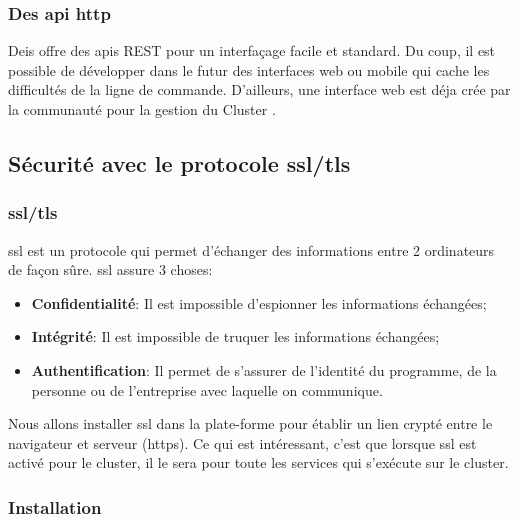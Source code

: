 \begin{onehalfspace}
\subsubsection*{Des \acrshort{api} \acrshort{http}}

Deis offre des \acrshort{api}s REST pour un interfaçage facile et standard. Du coup, il est possible de développer dans le futur des interfaces web ou mobile qui cache les difficultés de la ligne de commande. D'ailleurs, une interface web est déja crée par la communauté pour la gestion du Cluster \cite{deis-ui}.





\subsection{Sécurité avec le protocole \acrshort{ssl}/\acrshort{tls}}

\subsubsection{\acrshort{ssl}/\acrshort{tls}}


\acrshort{ssl} est un protocole qui permet d'échanger des informations entre 2 ordinateurs de façon sûre. \acrshort{ssl} assure 3 choses:

\begin{itemize}
	\item \textbf{Confidentialité}: Il est impossible d'espionner les informations échangées;
	\item \textbf{Intégrité}: Il est impossible de truquer les informations échangées;
	\item \textbf{Authentification}: Il permet de s'assurer de l'identité du programme, de la personne ou de l'entreprise avec laquelle on communique.
\end{itemize}



Nous allons installer \acrshort{ssl} dans la plate-forme pour établir un lien crypté entre le navigateur et serveur (\acrshort{https}). Ce qui est intéressant, c'est que lorsque \acrshort{ssl} est activé pour le cluster, il le sera pour toute les services qui s'exécute sur le cluster.



\subsubsection{Installation}


\end{onehalfspace}
